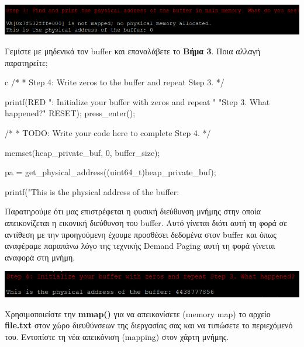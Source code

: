 \documentclass[12pt]{article}
\begin{document}
\centerline{\includegraphics[width=1\textwidth]{3_1_3.png}}

\begin{question}
Γεμίστε με μηδενικά τον buffer και επαναλάβετε το \textbf{Βήμα 3}. Ποια αλλαγή 
παρατηρείτε;
\end{question}

\begin{codeless}{c}
    /*
	 * Step 4: Write zeros to the buffer and repeat Step 3.
	 */

	printf(RED ": Initialize your buffer with zeros and repeat "
		"Step 3. What happened?\n" RESET);
	press_enter();

	/*
	 * TODO: Write your code here to complete Step 4.
	 */

	memset(heap_private_buf, 0, buffer_size);

	pa = get_physical_address((uint64_t)heap_private_buf);
	
	printf("This is the physical address of the buffer: %
\end{codeless}

Παρατηρούμε ότι μας επιστρέφεται η φυσική διεύθυνση μνήμης στην οποία απεικονίζεται 
η εικονική διεύθυνση του buffer. Αυτό γίνεται διότι αυτή τη φορά σε αντίθεση με την 
προηγούμενη έχουμε προσθέσει δεδομένα στον buffer και όπως αναφέραμε παραπάνω λόγο της 
τεχνικής Demand Paging αυτή τη φορά γίνεται αναφορά στη μνήμη.

\centerline{\includegraphics{3_1_4.png}}

\begin{question}
Χρησιμοποιείστε την \textbf{mmap()} για να απεικονίσετε (memory map) το αρχείο 
\textbf{file.txt} στον χώρο διευθύνσεων της διεργασίας σας και να τυπώσετε το 
περιεχόμενό του. Εντοπίστε τη νέα απεικόνιση (mapping) στον χάρτη μνήμης.
\end{question}
\end{document}
